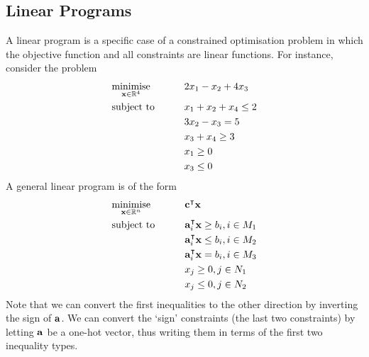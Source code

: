 \subsection{Linear Programs}
A linear program is a specific case of a constrained optimisation problem in which the objective function and all constraints are linear functions.
For instance, consider the problem
\begin{alignat*}{2}
	 & \underset{\vb x \in \mathbb R^4}{\text{minimise}} & \qquad & 2x_1 - x_2 + 4x_3      \\
	 & \text{subject to}                                 &        & x_1 + x_2 + x_4 \leq 2 \\
	 &                                                   &        & 3x_2 - x_3 = 5         \\
	 &                                                   &        & x_3 + x_4 \geq 3       \\
	 &                                                   &        & x_1 \geq 0             \\
	 &                                                   &        & x_3 \leq 0             \\
\end{alignat*}
A general linear program is of the form
\begin{alignat*}{2}
	 & \underset{\vb x \in \mathbb R^n}{\text{minimise}} & \qquad & \vb c^\intercal \vb x                       \\
	 & \text{subject to}                                 &        & \vb a_i^\intercal \vb x \geq b_i, i \in M_1 \\
	 &                                                   &        & \vb a_i^\intercal \vb x \leq b_i, i \in M_2 \\
	 &                                                   &        & \vb a_i^\intercal \vb x = b_i, i \in M_3    \\
	 &                                                   &        & x_j \geq 0, j \in N_1                        \\
	 &                                                   &        & x_j \leq 0, j \in N_2                        \\
\end{alignat*}
Note that we can convert the first inequalities to the other direction by inverting the sign of \( \vb a \).
We can convert the `sign' constraints (the last two constraints) by letting \( \vb a \) be a one-hot vector, thus writing them in terms of the first two inequality types.
